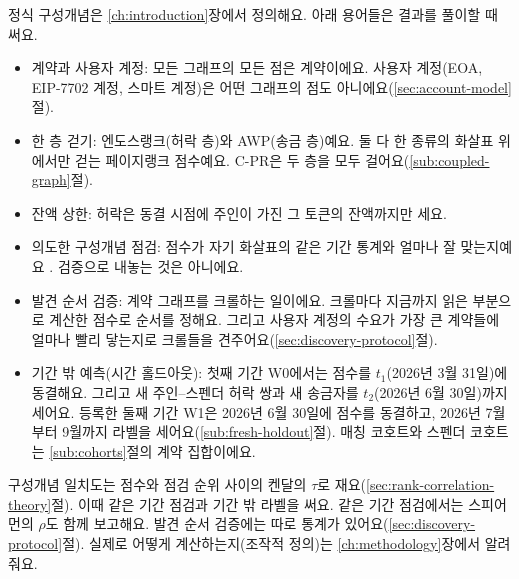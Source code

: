 
정식 구성개념은 \ref{ch:introduction}장에서 정의해요. 아래 용어들은 결과를 풀이할 때 써요.

\begin{itemize}
\item 계약과 사용자 계정: 모든 그래프의 모든 점은 계약이에요. 사용자 계정(EOA, EIP-7702 계정, 스마트 계정)은 어떤 그래프의 점도 아니에요(\ref{sec:account-model}절).
\item 한 층 걷기: 엔도스랭크(허락 층)와 AWP(송금 층)예요. 둘 다 한 종류의 화살표 위에서만 걷는 페이지랭크 점수예요. \mbox{C-PR}은 두 층을 모두 걸어요(\ref{sub:coupled-graph}절).
\item 잔액 상한: 허락은 동결 시점에 주인이 가진 그 토큰의 잔액까지만 세요.
\item 의도한 구성개념 점검: 점수가 자기 화살표의 같은 기간 통계와 얼마나 잘 맞는지예요 \parencite{cronbach1955construct}. 검증으로 내놓는 것은 아니에요.
\item 발견 순서 검증: 계약 그래프를 크롤하는 일이에요. 크롤마다 지금까지 읽은 부분으로 계산한 점수로 순서를 정해요. 그리고 사용자 계정의 수요가 가장 큰 계약들에 얼마나 빨리 닿는지로 크롤들을 견주어요(\ref{sec:discovery-protocol}절).
\item 기간 밖 예측(시간 홀드아웃): 첫째 기간 W0에서는 점수를 $t_1$(2026년 3월 31일)에 동결해요. 그리고 새 주인--스펜더 허락 쌍과 새 송금자를 $t_2$(2026년 6월 30일)까지 세어요. 등록한 둘째 기간 W1은 2026년 6월 30일에 점수를 동결하고, 2026년 7월부터 9월까지 라벨을 세어요(\ref{sub:fresh-holdout}절). 매칭 코호트와 스펜더 코호트는 \ref{sub:cohorts}절의 계약 집합이에요.
\end{itemize}


구성개념 일치도는 점수와 점검 순위 사이의 켄달의 $\tau$로 재요(\ref{sec:rank-correlation-theory}절). 이때 같은 기간 점검과 기간 밖 라벨을 써요. 같은 기간 점검에서는 스피어먼의 $\rho$도 함께 보고해요. 발견 순서 검증에는 따로 통계가 있어요(\ref{sec:discovery-protocol}절). 실제로 어떻게 계산하는지(조작적 정의)는 \ref{ch:methodology}장에서 알려 줘요.


